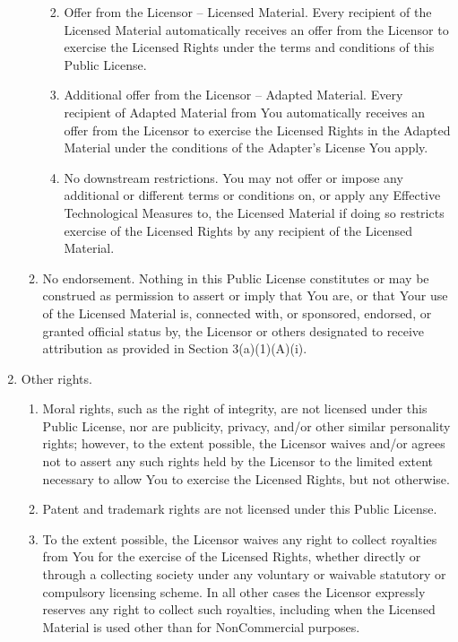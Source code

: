 \documentclass[]{scrbook}
\begin{document}
\begin{enumerate}
\begin{enumerate}
    \begin{enumerate}
    \def\labelenumiii{\alph{enumiii}.}
    \item
      Offer from the Licensor -- Licensed Material. Every recipient of
      the Licensed Material automatically receives an offer from the
      Licensor to exercise the Licensed Rights under the terms and
      conditions of this Public License.
    \item
      Additional offer from the Licensor -- Adapted Material. Every
      recipient of Adapted Material from You automatically receives an
      offer from the Licensor to exercise the Licensed Rights in the
      Adapted Material under the conditions of the Adapter's License You
      apply.
    \item
      No downstream restrictions. You may not offer or impose any
      additional or different terms or conditions on, or apply any
      Effective Technological Measures to, the Licensed Material if
      doing so restricts exercise of the Licensed Rights by any
      recipient of the Licensed Material.
    \end{enumerate}
  \item
    No endorsement. Nothing in this Public License constitutes or may be
    construed as permission to assert or imply that You are, or that
    Your use of the Licensed Material is, connected with, or sponsored,
    endorsed, or granted official status by, the Licensor or others
    designated to receive attribution as provided in Section
    3(a)(1)(A)(i).
  \end{enumerate}
\item
  Other rights.

  \begin{enumerate}
  \def\labelenumii{\arabic{enumii}.}
  \item
    Moral rights, such as the right of integrity, are not licensed under
    this Public License, nor are publicity, privacy, and/or other
    similar personality rights; however, to the extent possible, the
    Licensor waives and/or agrees not to assert any such rights held by
    the Licensor to the limited extent necessary to allow You to
    exercise the Licensed Rights, but not otherwise.
  \item
    Patent and trademark rights are not licensed under this Public
    License.
  \item
    To the extent possible, the Licensor waives any right to collect
    royalties from You for the exercise of the Licensed Rights, whether
    directly or through a collecting society under any voluntary or
    waivable statutory or compulsory licensing scheme. In all other
    cases the Licensor expressly reserves any right to collect such
    royalties, including when the Licensed Material is used other than
    for NonCommercial purposes.
  \end{enumerate}
\end{enumerate}
\end{document}

